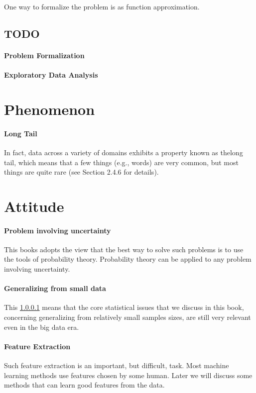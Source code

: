 \documentclass[11pt,a4paper]{article}
\begin{document}
One way to formalize the problem is as function approximation.

\subsection{TODO}
\paragraph{Problem Formalization}
\paragraph{Exploratory Data Analysis}\label{Definition:Exploratory Data Analysis}

\section{Phenomenon}
\paragraph{Long Tail}\label{Phenomenon:Long Tail}
In fact, data across a variety of domains exhibits a property known as thelong tail, 
which means that a few things (e.g., words) are very common, 
but most things are quite rare (see Section 2.4.6 for details).

\section{Attitude}
\paragraph{Problem involving uncertainty} 
This books adopts the view that the best way to solve such problems is to use the tools
of probability theory. Probability theory can be applied to any problem involving uncertainty.

\paragraph{Generalizing from small data}
This \ref{Phenomenon:Long Tail} means that the core statistical issues that we discuss in this book, 
concerning generalizing from relatively small samples sizes, 
are still very relevant even in the big data era.

\paragraph{Feature Extraction} 
Such feature extraction is an important, but difficult, task. 
Most machine learning methods use features chosen by some human. 
Later we will discuss some methods that can learn good features from the data.
\end{document}
